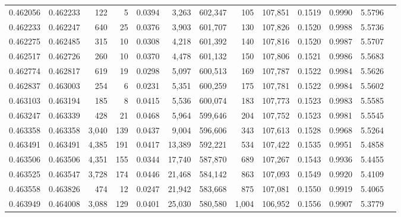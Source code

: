\begin{tabular}{rrrrrrrrrrrrr}
0.462056 & 0.462233 &   122 &     5 &                                     0.0394 &   3,263 & 602,347 &     105 & 107,851 & 0.1519 & 0.9990 & 5.5796 \\
0.462233 & 0.462247 &   640 &    25 &                                     0.0376 &   3,903 & 601,707 &     130 & 107,826 & 0.1520 & 0.9988 & 5.5736 \\
0.462275 & 0.462485 &   315 &    10 &                                     0.0308 &   4,218 & 601,392 &     140 & 107,816 & 0.1520 & 0.9987 & 5.5707 \\
0.462517 & 0.462726 &   260 &    10 &                                     0.0370 &   4,478 & 601,132 &     150 & 107,806 & 0.1521 & 0.9986 & 5.5683 \\
0.462774 & 0.462817 &   619 &    19 &                                     0.0298 &   5,097 & 600,513 &     169 & 107,787 & 0.1522 & 0.9984 & 5.5626 \\
0.462837 & 0.463003 &   254 &     6 &                                     0.0231 &   5,351 & 600,259 &     175 & 107,781 & 0.1522 & 0.9984 & 5.5602 \\
0.463103 & 0.463194 &   185 &     8 &                                     0.0415 &   5,536 & 600,074 &     183 & 107,773 & 0.1523 & 0.9983 & 5.5585 \\
0.463247 & 0.463339 &   428 &    21 &                                     0.0468 &   5,964 & 599,646 &     204 & 107,752 & 0.1523 & 0.9981 & 5.5545 \\
0.463358 & 0.463358 & 3,040 &   139 &                                     0.0437 &   9,004 & 596,606 &     343 & 107,613 & 0.1528 & 0.9968 & 5.5264 \\
0.463491 & 0.463491 & 4,385 &   191 &                                     0.0417 &  13,389 & 592,221 &     534 & 107,422 & 0.1535 & 0.9951 & 5.4858 \\
0.463506 & 0.463506 & 4,351 &   155 &                                     0.0344 &  17,740 & 587,870 &     689 & 107,267 & 0.1543 & 0.9936 & 5.4455 \\
0.463525 & 0.463547 & 3,728 &   174 &                                     0.0446 &  21,468 & 584,142 &     863 & 107,093 & 0.1549 & 0.9920 & 5.4109 \\
0.463558 & 0.463826 &   474 &    12 &                                     0.0247 &  21,942 & 583,668 &     875 & 107,081 & 0.1550 & 0.9919 & 5.4065 \\
0.463949 & 0.464008 & 3,088 &   129 &                                     0.0401 &  25,030 & 580,580 &   1,004 & 106,952 & 0.1556 & 0.9907 & 5.3779 \\

\end{tabular}
